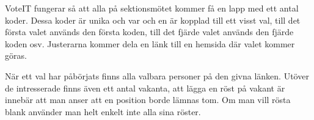 \documentclass[11pt, noincludeaddress]{classes/cthit}
\begin{document}
VoteIT fungerar så att alla på sektionsmötet kommer få en lapp med ett antal koder. Dessa koder är unika och var och en är kopplad till ett visst val, till det första valet används den första koden, till det fjärde valet används den fjärde koden osv. Justerarna kommer dela en länk till en hemsida där valet kommer göras.

När ett val har påbörjats finns alla valbara personer på den givna länken. Utöver de intresserade finns även ett antal vakanta, att lägga en röst på vakant är innebär att man anser att en position borde lämnas tom. Om man vill rösta blank använder man helt enkelt inte alla sina röster.
\end{document}
